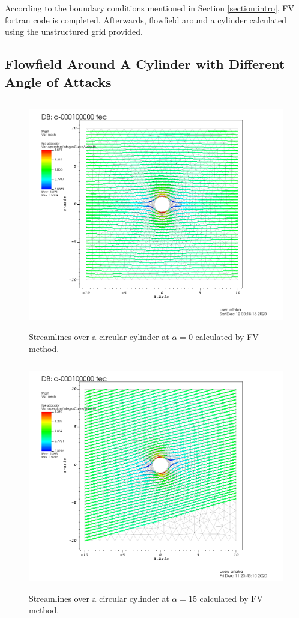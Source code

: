 \documentclass[letterpaper,12pt]{article}
\begin{document}
According to the boundary conditions mentioned in Section \ref{section:intro}, FV fortran code
is completed. Afterwards, flowfield around a cylinder calculated using the unstructured grid provided.

\subsection{Flowfield Around A Cylinder with Different Angle of Attacks}
\begin{figure} [ht]
	\centering
	\includegraphics[height = 10cm]{graph/0deg/Cylinder_0angle_streamline0000.png}
	\caption{Streamlines over a circular cylinder at $\alpha=0$ calculated by FV method.}
    \label{fig:q2st0}
\end{figure}
\begin{figure} [ht]
	\centering
	\includegraphics[height = 10cm]{graph/15deg/Cylinder_15angle_streamline0000.png}
	\caption{Streamlines over a circular cylinder at $\alpha=15$ calculated by FV method.}
    \label{fig:q2st15}
\end{figure}
\end{document}
